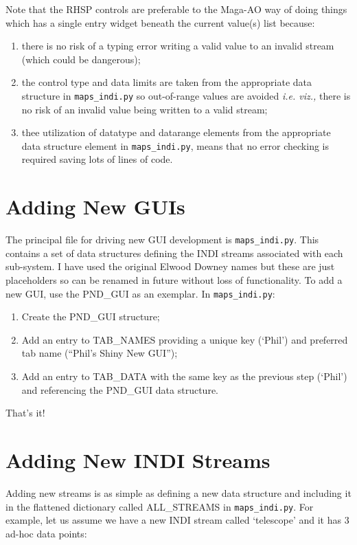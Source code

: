 \documentclass[12pt,twoside]{article}
\begin{document}
Note that the RHSP controls are preferable to the Maga-AO way of doing things which has a single
entry widget beneath the current value(s) list because:

\begin{enumerate}
 \item there is no risk of a typing error writing a valid value to an invalid stream (which could be dangerous);
 \item the control type and data limits are taken from the appropriate data structure in {\tt maps\_indi.py} so
       out-of-range values are avoided
  \emph{i.e. viz.,} there is no risk of an invalid value being written to a valid stream;
 \item thee utilization of datatype and datarange elements from the appropriate data structure element in {\tt maps\_indi.py}, means that
       no error checking is required saving lots of lines of code.
\end{enumerate}

\section{Adding New GUIs}
\label{Adding New GUIs}

The principal file for driving new GUI development is {\tt maps\_indi.py}. This
contains a set of data structures defining the INDI streams associated with each
sub-system. I have used the original Elwood Downey names but these are just placeholders
so can be renamed in future without loss of functionality. 
To add a new GUI, use the PND\_GUI as an exemplar. In {\tt maps\_indi.py}: \\

\begin{enumerate}
 \item Create the PND\_GUI structure;
 \item Add an entry to TAB\_NAMES providing a unique key (`Phil') and preferred tab name (``Phil's Shiny New GUI'');
 \item Add an entry to TAB\_DATA with the same key as the previous step (`Phil') and referencing the PND\_GUI data structure.
\end{enumerate}

That's it!

\section{Adding New INDI Streams}
\label{Adding New INDI Streams}
Adding new streams is as simple as defining a new data structure and including it in the flattened dictionary called
ALL\_STREAMS in {\tt maps\_indi.py}. For example, let us assume we have a new INDI stream called `telescope' and it has 3 ad-hoc data points:
\end{document}
